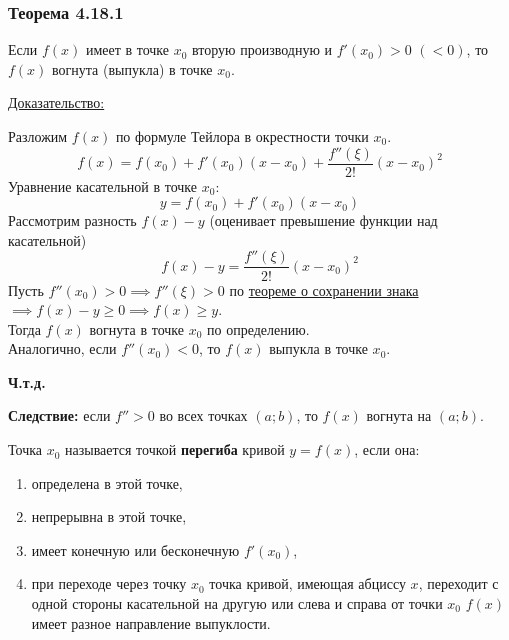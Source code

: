 \documentclass[12pt]{article}
\begin{document}
    \subsubsection*{Теорема 4.18.1}\label{th:4.18.1}
    Если $f(x)$ имеет в точке $x_0$ вторую производную и $f'(x_0) > 0$ $(< 0)$, то $f(x)$ вогнута (выпукла) в точке $x_0$.\par\noindent
    \underline{Доказательство:}
    \begin{adjustwidth}{1.5em}{1.5em}
        Разложим $f(x)$ по формуле Тейлора в окрестности точки $x_0$.
        \[ f(x) = f(x_0) + f'(x_0)(x-x_0) + \frac{f''(\xi)}{2!}(x-x_0)^2 \]
        Уравнение касательной в точке $x_0$:
        \[ y = f(x_0) + f'(x_0)(x-x_0) \]
        Рассмотрим разность $f(x) - y$ (оценивает превышение функции над касательной)
        \[ f(x) - y = \frac{f''(\xi)}{2!}(x-x_0)^2 \]
        Пусть $f''(x_0) > 0 \implies f''(\xi) > 0$ по \hyperref[th:3.3.2]{теореме о сохранении знака} $\implies f(x) - y \ge 0 \implies f(x) \ge y$.\\
        Тогда $f(x)$ вогнута в точке $x_0$ по определению.\\
        Аналогично, если $f''(x_0) < 0$, то $f(x)$ выпукла в точке $x_0$.
        \begin{center}
            \textbf{Ч.т.д.}
        \end{center}
    \end{adjustwidth}
    \textbf{Следствие:} если $f''>0$ во всех точках $(a; b)$, то $f(x)$ вогнута на $(a; b)$.\par\noindent
    Точка $x_0$ называется точкой \textbf{перегиба} кривой $y = f(x)$, если она:
    \begin{enumerate}
        \item определена в этой точке,
        \item непрерывна в этой точке, 
        \item имеет конечную или бесконечную $f'(x_0)$, 
        \item при переходе через точку $x_0$ точка кривой, имеющая абциссу $x$, переходит с одной стороны касательной на другую или слева и справа от точки $x_0$ $f(x)$ имеет разное направление выпуклости.
    \end{enumerate}
\end{document}
